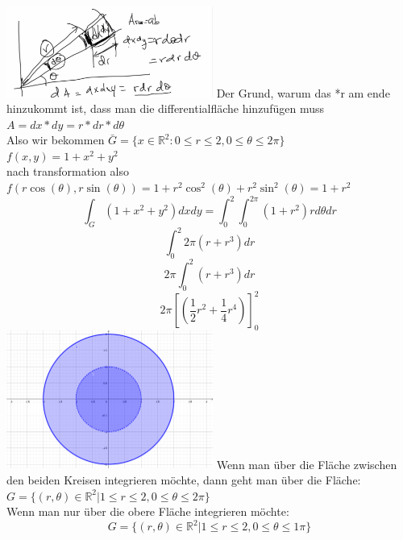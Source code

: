 \documentclass{article}
\begin{document}
	\includegraphics[width=256px]{GeometrischeInterpretation.png}
	Der Grund, warum das *r am ende hinzukommt ist, dass man die differentialfläche  hinzufügen muss $A = dx*dy = r* dr*d\theta$\\
	Also wir bekommen $\bar G = \{x\in\mathbb{R}^2: 0\leq r\leq 2, 0\leq \theta\leq 2\pi\}$\\
	$f(x,y)=1+x^2+y^2$\\
	nach transformation also $f(r\cos(\theta),r\sin(\theta)) = 1+r^2\cos^2(\theta)+r^2\sin^2(\theta) = 1+r^2$\\
	$$\int_G(1+x^2+y^2)dxdy = \int^2_0\int ^{2\pi}_0 (1+r^2)rd\theta dr$$
	$$\int_0^2 2\pi (r+r^3)dr$$
	$$2\pi\int_0^2  (r+r^3)dr$$
	$$2\pi[(\frac{1}{2}r^2+\frac{1}{4}r^4)]^2_0$$
	\includegraphics[width=256px]{2Beispiel.png}
	Wenn man über die Fläche zwischen den beiden Kreisen integrieren möchte, dann geht man über die Fläche:\\
	$G=\{(r,\theta)\in\mathbb{R}^2|1\leq r\leq 2, 0\leq \theta\leq 2\pi\}$\\
	Wenn man nur über die obere Fläche integrieren möchte:\\
	$$G=\{(r,\theta)\in\mathbb{R}^2|1\leq r\leq 2, 0\leq \theta\leq 1\pi\}$$
\end{document}
